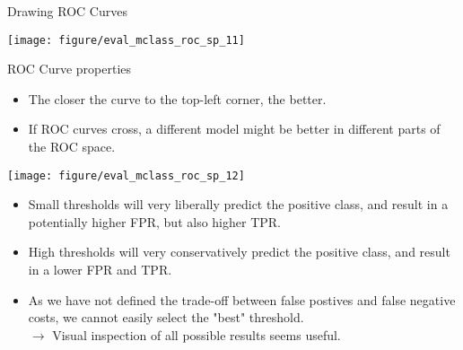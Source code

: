 \documentclass[11pt,compress,t,notes=noshow, xcolor=table]{beamer}
\newenvironment{knitrout}{}{} %
\begin{document}

\begin{vbframe}{Drawing ROC Curves}

\begin{knitrout}\scriptsize
{}\color{fgcolor}

{
\texttt{[image: figure/eval\_mclass\_roc\_sp\_11]}
}

\end{knitrout}

\end{vbframe}


\begin{vbframe}{ROC Curve properties}

\begin{minipage}[c]{0.5\textwidth}
  \begin{itemize}
    \item The closer the curve to the top-left corner, the better.
    \item If ROC curves cross, a different model might be better in different 
    parts of the ROC space.
\end{itemize}
\end{minipage}%
\begin{minipage}[c]{0.5\textwidth}
  \centering 
  \texttt{[image: figure/eval\_mclass\_roc\_sp\_12]}
\end{minipage}

\lz

\begin{itemize}
  \item Small thresholds will very liberally predict the positive class, and 
  result in a potentially higher FPR, but also higher TPR.
  \item High thresholds will very conservatively predict the positive class, 
  and result in a lower FPR and TPR.
  \item As we have not defined the trade-off between false postives and false 
  negative costs, we cannot easily select the "best" threshold. \\
  $\rightarrow$ Visual inspection of all possible results seems useful.
\end{itemize}

% 


\end{vbframe}
\end{document}
